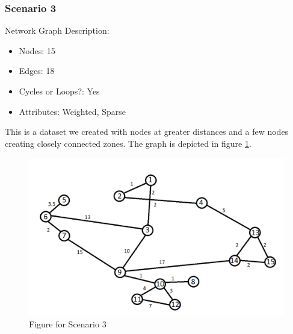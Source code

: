 \documentclass[10pt]{extarticle}
\begin{document}
	
	\subsubsection{Scenario 3}
	Network Graph Description:
	\begin{itemize}
		\item Nodes: 15
		\item Edges: 18
		\item Cycles or Loops?: Yes
		\item Attributes: Weighted, Sparse
	\end{itemize}
	This is a dataset we created with nodes at greater distances and a few nodes creating closely connected zones. The graph is depicted in figure \ref{fig:separate}.
	\begin{figure}
		\includegraphics[width=\linewidth]{separated.png}
		\caption{Figure for Scenario 3}
		\label{fig:separate}
	\end{figure}
\end{document}
